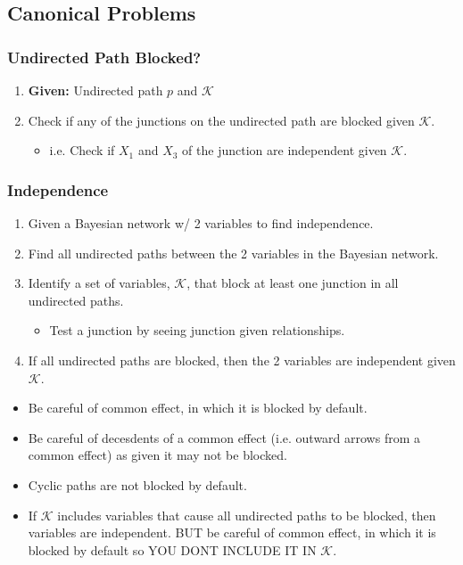 \subsection{Canonical Problems}
\subsubsection{Undirected Path Blocked?}
\begin{process}
    \begin{enumerate}
        \item \textbf{Given:} Undirected path $p$ and $\mathcal{K}$
        \item Check if any of the junctions on the undirected path are blocked given $\mathcal{K}$.
        \begin{itemize}
            \item i.e. Check if $X_1$ and $X_3$ of the junction are independent given $\mathcal{K}$.
        \end{itemize}
    \end{enumerate}
\end{process}

\subsubsection{Independence}
\begin{process}
    \begin{enumerate}
        \item Given a Bayesian network w/ 2 variables to find independence.
        \item Find all undirected paths between the 2 variables in the Bayesian network.
        \item Identify a set of variables, $\mathcal{K}$, that block at least one junction in all undirected paths.
        \begin{itemize}
            \item Test a junction by seeing junction given relationships. 
        \end{itemize}
        \item If all undirected paths are blocked, then the 2 variables are independent given $\mathcal{K}$.
    \end{enumerate}
\end{process}

\begin{warning}
    \begin{itemize}
        \item Be careful of common effect, in which it is blocked by default. 
        \item Be careful of decesdents of a common effect (i.e. outward arrows from a common effect) as given it may not be blocked.
        \item Cyclic paths are not blocked by default.
        \item If $\mathcal{K}$ includes variables that cause all undirected paths to be blocked, then variables are independent. BUT be careful of common effect, in which it is blocked by default so YOU DONT INCLUDE IT IN $\mathcal{K}$.
    \end{itemize}
\end{warning}

